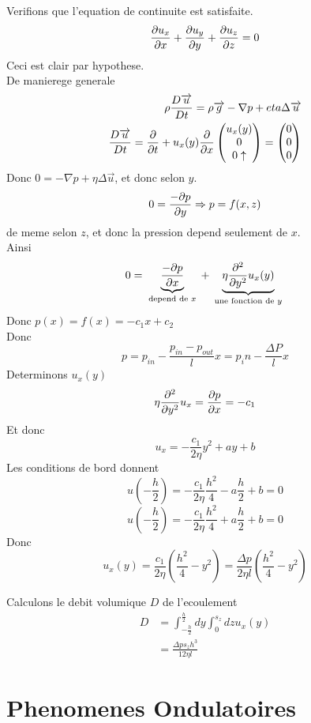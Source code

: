 \documentclass[../main.tex]{subfiles}
\begin{document}
Verifions que l'equation de continuite est satisfaite.
\[ 
\frac{\partial u_x}{\partial x} + \frac{\partial u_y}{\partial y}+\frac{\partial u_z}{\partial z} = 0
\]
Ceci est clair par hypothese.\\
De manierege generale
\begin{align*}
\rho \frac{D \overrightarrow{u}}{Dt} = \rho \overrightarrow{g} - \nabla p + eta \Delta \overrightarrow{u}\\
\frac{D \overrightarrow{u}}{Dt}= \frac{\partial }{\partial t }+ u_x ( y) \frac{\partial }{\partial x}  
\begin{pmatrix}
	u_x( y) \\ 0 \\ 0\uparrow
\end{pmatrix}
= 
\begin{pmatrix}
0\\0\\0
\end{pmatrix}
\end{align*}
Donc $0 = -\nabla p + \eta \Delta \vec{u}$, et donc selon $y$.
\[ 
	0 = \frac{- \partial p}{\partial y} \Rightarrow p = f( x,z) 
\]
de meme selon $z$, et donc la pression depend seulement de $x$.\\
Ainsi
\[ 
	0 = \underbrace{\frac{- \partial p}{\partial x}}_{ \text{ depend de $x$ } } + \underbrace{\eta \frac{\partial ^{2}}{\partial y^{2}} u_{x} ( y)
}_{ \text{ une fonction de $y$ }}
\]
Donc
$p( x) = f( x) = -c_{1} x + c_2$\\
Donc
\[ 
p = p_{in} - \frac{p_{in} - p_{out} }{l}x = p_in - \frac{\Delta P}{l} x
\]
Determinons $u_x( y) $ 
\[ 
\eta \frac{\partial ^{2}}{\partial y^{2}}u_x = \frac{\partial p}{\partial x }= -c_1
\]
Et donc
\[ 
 u_x = - \frac{c_1}{2 \eta}y ^{2} + ay + b
\]
Les conditions de bord donnent 
\[ 
	u( - \frac{h}{2}) = - \frac{c_1}{2 \eta} \frac{h^{2}}{4} - a \frac{h}{2} + b = 0
\]
\[ 
	u( - \frac{h}{2}) = - \frac{c_1}{2 \eta} \frac{h^{2}}{4} + a \frac{h}{2} + b = 0
\]
Donc
\[ 
	u_x( y ) = \frac{c_1}{2 \eta } ( \frac{h^{2}}{4}-y^{2})  = \frac{\Delta p}{2 \eta l} ( \frac{h^{2}}{4}- y^{2}) 
\]

Calculons le debit volumique $D$ de l'ecoulement 
\begin{align*}
	D &= \int_{ - \frac{h}{2} }^{ \frac{h}{2} } dy \int_{ 0 }^{ s_z }dz u_x ( y) \\
&= \frac{\Delta p s_z h^{3}}{12 \eta l}
\end{align*}
\section{Phenomenes Ondulatoires}
\end{document}
